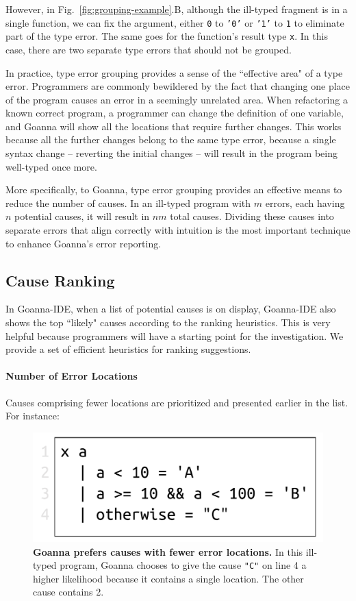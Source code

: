 \documentclass[pdflatex,lineno,sn-nature,Numbered]{sn-jnl}%
\begin{document}
    However, in Fig.~\ref{fig:grouping-example}.B, although the ill-typed fragment is in a single function, we can fix the argument, either \texttt{0} to \texttt{'0'} or \texttt{'1'} to \texttt{1} to eliminate part of the type error. The same goes for the function's result type \texttt{x}. In this case, there are two separate type errors that should not be grouped.

	In practice, type error grouping provides a sense of the ``effective area" of a type error. Programmers are commonly bewildered by the fact that changing one place of the program causes an error in a seemingly unrelated area. When refactoring a known correct program, a programmer can change the definition of one variable, and Goanna will show all the locations that require further changes. This works because all the further changes belong to the same type error, because a single syntax change -- reverting the initial changes -- will result in the program being well-typed once more.
	
	More specifically, to Goanna, type error grouping provides an effective means to reduce the number of causes. In an ill-typed program with $m$ errors, each having $n$ potential causes, it will result in $nm$ total causes. Dividing these causes into separate errors that align correctly with intuition is the most important technique to enhance Goanna's error reporting.

    \subsection{Cause Ranking} \label{sub:ranking}
     In Goanna-IDE, when a list of potential causes is on display, Goanna-IDE also shows the top ``likely" causes according to the ranking heuristics. This is very helpful because programmers will have a starting point for the investigation. We provide a set of efficient heuristics for ranking suggestions. 

    \paragraph{Number of Error Locations}
    Causes comprising fewer locations are prioritized and presented earlier in the list. For instance:
   \begin{figure}[ht!]
        \centering
        \includegraphics[width=0.5\linewidth]{images/Loc-Count}
        \caption[Goanna prefers causes with fewer error locations]{\textbf{Goanna prefers causes with fewer error locations.} In this ill-typed program, Goanna chooses to give the cause \texttt{"C"} on line 4 a higher likelihood because it contains a single location. The other cause contains 2. }
        \label{fig:loc-count}
    \end{figure}
\end{document}

